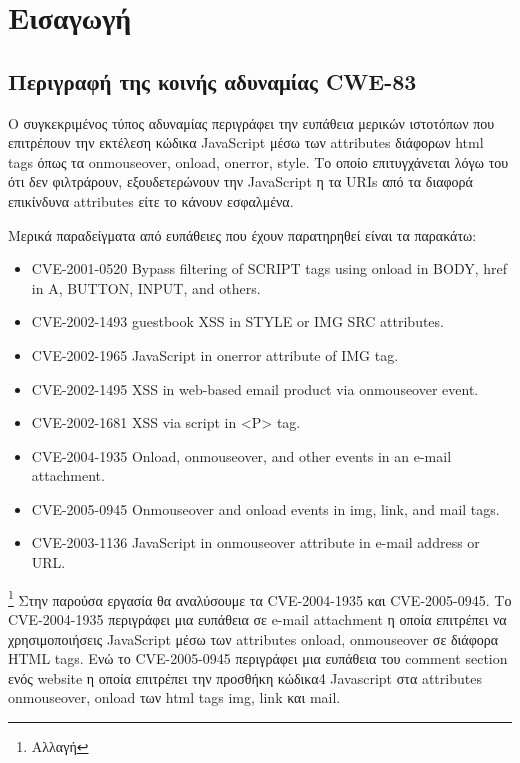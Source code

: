%
%
\setcounter{chapter}{1}
\section{Εισαγωγή}
\subsection{Περιγραφή της κοινής αδυναμίας CWE-83}
\noindent
Ο συγκεκριμένος τύπος αδυναμίας περιγράφει την ευπάθεια μερικών ιστοτόπων που επιτρέπουν την εκτέλεση κώδικα JavaScript μέσω των attributes διάφορων html tags όπως τα onmouseover, onload,  onerror, style. Το οποίο επιτυγχάνεται λόγω του ότι δεν φιλτράρουν, εξουδετερώνουν την JavaScript η τα URIs από τα διαφορά επικίνδυνα attributes είτε το κάνουν εσφαλμένα.

\noindent
Μερικά παραδείγματα από ευπάθειες που έχουν παρατηρηθεί είναι τα παρακάτω:

\begin{itemize}
	\item CVE-2001-0520 Bypass filtering of SCRIPT tags using onload in BODY, href in A, BUTTON, INPUT, and others.
	\item CVE-2002-1493 guestbook XSS in STYLE or IMG SRC attributes. 
	\item CVE-2002-1965 JavaScript in onerror attribute of IMG tag. 
	\item CVE-2002-1495 XSS in web-based email product via onmouseover event. 
	\item CVE-2002-1681 XSS via script in <P> tag. 
	\item CVE-2004-1935 Onload, onmouseover, and other events in an e-mail attachment. 
	\item CVE-2005-0945 Onmouseover and onload events in img, link, and mail tags. 
	\item CVE-2003-1136 JavaScript in onmouseover attribute in e-mail address or URL. 
	
\end{itemize}


\noindent
\footnote{Αλλαγή} Στην παρούσα εργασία θα αναλύσουμε τα CVE-2004-1935 και CVE-2005-0945. 
Το CVE-2004-1935 περιγράφει μια ευπάθεια σε e-mail attachment η οποία επιτρέπει να χρησιμοποιήσεις JavaScript μέσω των attributes onload, onmouseover σε διάφορα HTML tags. Ενώ το  CVE-2005-0945 περιγράφει μια ευπάθεια του comment section ενός website η οποία επιτρέπει την προσθήκη κώδικα4 Javascript στα attributes onmouseover, onload των html tags img, link και mail.